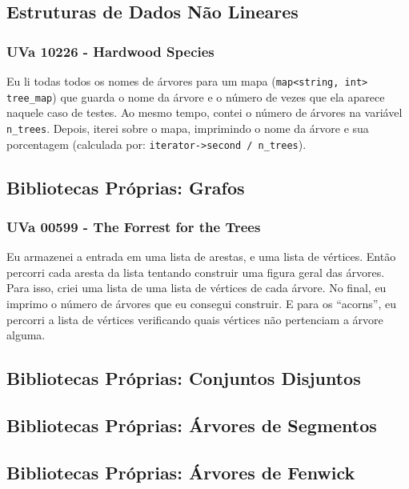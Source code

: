 \documentclass[11pt]{scrartcl}
\newcommand{\code}[1]{\texttt{\colorbox{bg_code_color}{#1}}}
\begin{document}
\subsection{Estruturas de Dados Não Lineares}
\subsubsection{UVa 10226 - Hardwood Species}
Eu li todas todos os nomes de árvores para um mapa (\code{map<string, int> tree\_map}) que guarda o nome da árvore e o número de vezes que ela aparece naquele caso de testes. Ao mesmo tempo, contei o número de árvores na variável \code{n\_trees}. Depois, iterei sobre o mapa, imprimindo o nome da árvore e sua porcentagem (calculada por: \code{iterator->second / n\_trees}).



\subsection{Bibliotecas Próprias: Grafos}
\subsubsection{UVa 00599 - The Forrest for the Trees}
Eu armazenei a entrada em uma lista de arestas, e uma lista de vértices. Então percorri cada aresta da lista tentando construir uma figura geral das árvores. Para isso, criei uma lista de uma lista de vértices de cada árvore. No final, eu imprimo o número de árvores que eu consegui construir. E para os ``acorns'', eu percorri a lista de vértices verificando quais vértices não pertenciam a árvore alguma.


\subsection{Bibliotecas Próprias: Conjuntos Disjuntos}

\subsection{Bibliotecas Próprias: Árvores de Segmentos}

\subsection{Bibliotecas Próprias: Árvores de Fenwick}
\end{document}
